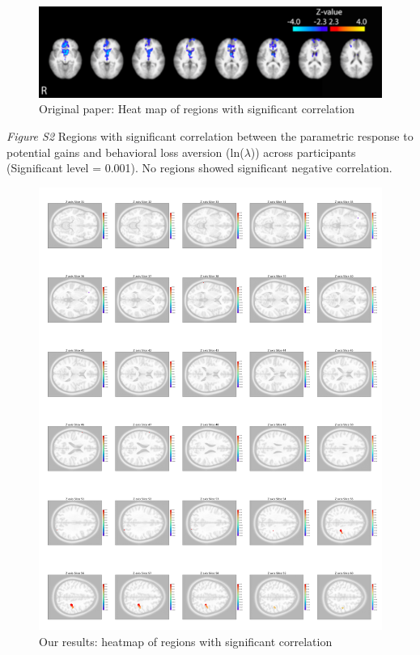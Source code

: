 \documentclass[11pt]{article}
\begin{document}
\begin{figure}[H]
    \centering
        \includegraphics[scale=0.5]{figures/Regression3/Orig_sig_cor_z_loss.png}
    \caption{Original paper: Heat map of regions with significant correlation}
\end{figure}

\newpage

\emph{Figure S2} Regions with significant correlation between the parametric response to potential gains and behavioral loss aversion (ln($\lambda$)) across participants (Significant level = 0.001).  No regions showed significant negative correlation.

\begin{figure}[H]\label{sig_cor_z_gain}
    \centering
        \includegraphics[scale=0.105]{figures/Regression3/sig_cor_z_gain.png}
    \caption{Our results: heatmap of regions with significant correlation}
\end{figure}
\end{document}
